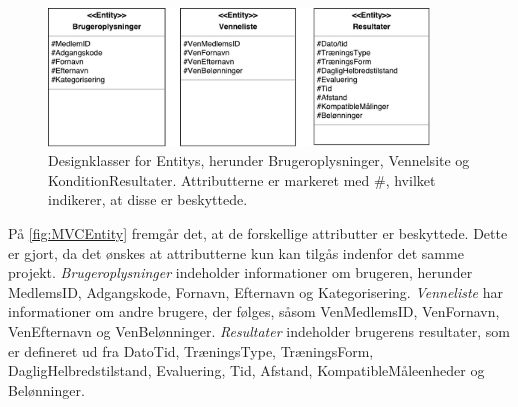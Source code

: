 \begin{figure} [H]
\centering
\includegraphics[width=0.9\textwidth]{figures/MVC/Entity}
\caption{Designklasser for Entitys, herunder Brugeroplysninger, Vennelsite og KonditionResultater. Attributterne er markeret med \#, hvilket indikerer, at disse er beskyttede.}
\label{fig:MVCEntity}
\end{figure}

\noindent
På \autoref{fig:MVCEntity} fremgår det, at de forskellige attributter er beskyttede. Dette er gjort, da det ønskes at attributterne kun kan tilgås indenfor det samme projekt. 
\textit{Brugeroplysninger} indeholder informationer om brugeren, herunder MedlemsID, Adgangskode, Fornavn, Efternavn og Kategorisering. 
\textit{Venneliste} har informationer om andre brugere, der følges, såsom VenMedlemsID, VenFornavn, VenEfternavn og VenBelønninger. 
\textit{Resultater} indeholder brugerens resultater, som er defineret ud fra DatoTid, TræningsType, TræningsForm, DagligHelbredstilstand, Evaluering, Tid, Afstand, KompatibleMåleenheder og Belønninger. 

